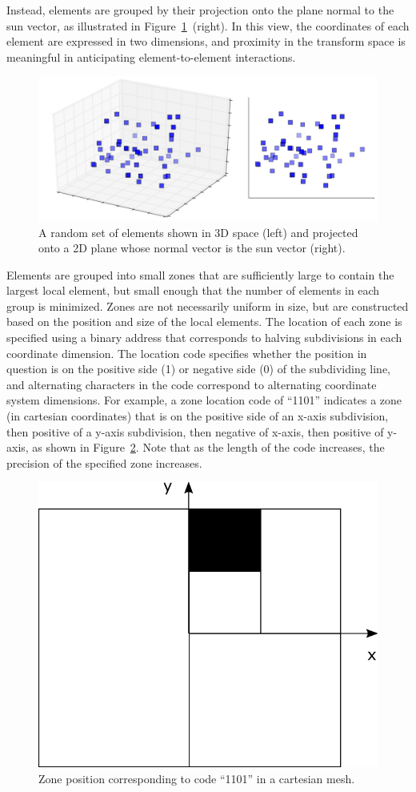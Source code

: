 \documentclass[11pt,letterpaper]{article}
\begin{document}
Instead, elements are grouped by their projection onto the plane normal to the sun vector, as illustrated in Figure~\ref{fig:proj}~(right). 
In this view, the coordinates of each element are expressed in two dimensions, and proximity in the transform space is meaningful in anticipating element-to-element interactions. 

\begin{figure}[htb]
\centering
\includegraphics[width=\linewidth]{projection-h3}
\caption{A random set of elements shown in 3D space (left) and projected onto a 2D plane whose normal vector is the sun vector (right).}
\label{fig:proj}
\end{figure}

Elements are grouped into small zones that are sufficiently large to contain the largest local element, but small enough that the number of elements in each group is minimized. 
Zones are not necessarily uniform in size, but are constructed based on the position and size of the local elements. 
The location of each zone is specified using a binary address that corresponds to halving subdivisions in each coordinate dimension. 
The location code specifies whether the position in question is on the positive side (1) or negative side (0) of the subdividing line, and alternating characters in the code correspond to alternating coordinate system dimensions. 
For example, a zone location code of ``1101'' indicates a zone (in cartesian coordinates) that is on the positive side of an x-axis subdivision, then positive of a y-axis subdivision, then negative of x-axis, then positive of y-axis, as shown in Figure~\ref{fig:cart-map}. 
Note that as the length of the code increases, the precision of the specified zone increases. 

\begin{figure}
[htb]
\centering
\includegraphics[width=0.35\linewidth]{cart-map}
\caption{Zone position corresponding to code ``1101'' in a cartesian mesh.}
\label{fig:cart-map}
\end{figure}
\end{document}
